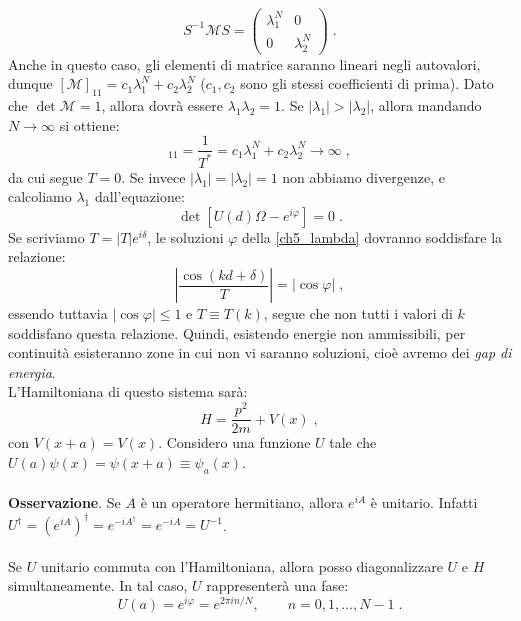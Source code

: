 \documentclass[12pt,a4paper]{report}
\theoremstyle{definition}
\numberwithin{equation}{section}
\newcommand{\adj}[1]{#1^{\dagger}}
\begin{document}
\begin{equation}
S^{-1}\mathcal{M}S=\left(\begin{matrix}
\lambda_1^N & 0 \\
0 & \lambda_2^N
\end{matrix}\right)\;.
\end{equation}
Anche in questo caso, gli elementi di matrice saranno lineari negli autovalori, dunque $[\mathcal{M}]_{11}=c_1\lambda_1^N+c_2\lambda_2^N$ ($c_1,c_2$ sono gli stessi coefficienti di prima). Dato che $\det\mathcal{M}=1$, allora dovrà essere $\lambda_1\lambda_2=1$. Se $|\lambda_1|>|\lambda_2|$, allora mandando $N\to\infty$ si ottiene:
\begin{equation}
[\mathcal{M}]_{11}=\frac{1}{T^*}=c_1\lambda_1^N+c_2\lambda_2^N\to\infty\;,
\end{equation}
da cui segue $T=0$. Se invece $|\lambda_1|=|\lambda_2|=1$ non abbiamo divergenze, e calcoliamo $\lambda_1$ dall'equazione:
\begin{equation}
\det\left[U(d)\Omega-e^{i\varphi}\right]=0\;. \label{ch5_lambda}
\end{equation}
Se scriviamo $T=|T|e^{i\delta}$, le soluzioni $\varphi$ della \eqref{ch5_lambda} dovranno soddisfare la relazione:
\begin{equation}
\left|\frac{\cos(kd+\delta)}{T}\right|=|\cos\varphi|\;,
\end{equation}
essendo tuttavia $|\cos\varphi|\le 1$ e $T\equiv T(k)$, segue che non tutti i valori di $k$ soddisfano questa relazione. Quindi, esistendo energie non ammissibili, per continuità esisteranno zone in cui non vi saranno soluzioni, cioè avremo dei \textit{gap di energia}. \\
L'Hamiltoniana di questo sistema sarà:
\begin{equation}
H=\frac{p^2}{2m}+V(x)\;,
\end{equation}
con $V(x+a)=V(x)$. Considero una funzione $U$ tale che $U(a)\psi(x)=\psi(x+a)\equiv\psi_a(x)$. \\
\\
\textbf{Osservazione}. Se $A$ è un operatore hermitiano, allora $e^{iA}$ è unitario. Infatti $\adj{U}=\adj{(e^{iA})}=e^{-i\adj{A}}=e^{-iA}=U^{-1}$. \\
\\
Se $U$ unitario commuta con l'Hamiltoniana, allora posso diagonalizzare $U$ e $H$ simultaneamente. In tal caso, $U$ rappresenterà una fase:
\begin{equation}
U(a)=e^{i\varphi}=e^{2\pi in/N},\qquad n=0,1,\ldots,N-1\;.
\end{equation}
\end{document}
